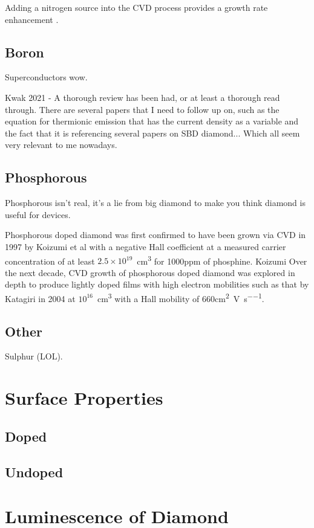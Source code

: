 Adding a nitrogen source into the CVD process provides a growth rate enhancement \cite{dunst2009}.

\subsection{Boron}
Superconductors wow.

Kwak 2021 - A thorough review has been had, or at least a thorough read through. There are several papers that I need to follow up on, such as the equation for thermionic emission that has the current density as a variable and the fact that it is referencing several papers on SBD diamond... Which all seem very relevant to me nowadays.

\subsection{Phosphorous}
\label{subsection:phosphorous_doping}
Phosphorous isn't real, it's a lie from big diamond to make you think diamond is useful for devices.

Phosphorous doped diamond was first confirmed to have been grown via CVD in 1997 by Koizumi et al with a negative Hall coefficient at a measured carrier concentration of at least $2.5\times10^{19}$\si{\per\centi\metre\cubed} for 1000ppm of phosphine. Koizumi  Over the next decade, CVD growth of phosphorous doped diamond was explored in depth to produce lightly doped films with high electron mobilities such as that by Katagiri in 2004 at $10^{16}$\si{\per\centi\metre\cubed} with a Hall mobility of $660$\si{\centi\metre\squared\per\volt\per\second}.
\subsection{Other}
Sulphur (LOL).
\section{Surface Properties}
\subsection{Doped}
\subsection{Undoped}

\section{Luminescence of Diamond}

